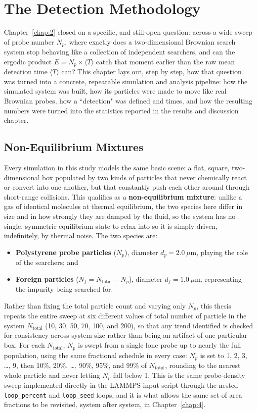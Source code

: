 \chapter{The Detection Methodology}
\label{chap:3}
Chapter~\ref{chap:2} closed on a specific, and still-open question: across a wide sweep of probe number $N_p$, where exactly does a two-dimensional Brownian search system stop behaving like a collection of independent searchers, and can the ergodic product $E = N_p \times \langle T \rangle$ catch that moment earlier than the raw mean detection time $\langle T \rangle$ can? This chapter lays out, step by step, how that question was turned into a concrete, repeatable simulation and analysis pipeline: how the simulated system was built, how its particles were made to move like real Brownian probes, how a ``detection" was defined and times, and how the resulting numbers were turned into the statistics reported in the results and discussion chapter.

\section{Non-Equilibrium Mixtures}
\label{sec:3.1}
Every simulation in this study models the same basic scene: a flat, square, two-dimensional box populated by two kinds of particles that never chemically react or convert into one another, but that constantly push each other around through short-range collisions. This qualifies as a \textbf{non-equilibrium mixture}: unlike a gas of identical molecules at thermal equilibrium, the two species here differ in size and in how strongly they are damped by the fluid, so the system has no single, symmetric equilibrium state to relax into so it is simply driven, indefinitely, by thermal noise. The two species are:

\begin{itemize}
  \item \textbf{Polystyrene probe particles} ($N_p$), diameter $d_p = 2.0~\mu\text{m}$, playing the role of the searchers; and
  \item \textbf{Foreign particles} ($N_f = N_\text{total} - N_p$), diameter $d_f = 1.0~\mu\text{m}$, representing the impurity being searched for.
\end{itemize}

Rather than fixing the total particle count and varying only $N_p$, this thesis repeats the entire sweep at six different values of total number of particle in the system $N_\text{total}$ (10, 30, 50, 70, 100, and 200), so that any trend identified is checked for consistency across system size rather than being an artifact of one particular box. For each $N_\text{total}$, $N_p$ is swept from a single lone probe up to nearly the full population, using the same fractional schedule in every case: $N_p$ is set to 1, 2, 3, \ldots, 9, then 10\%, 20\%, \ldots, 90\%, 95\%, and 99\% of $N_\text{total}$, rounding to the nearest whole particle and never letting $N_p$ fall below 1. This is the same probe-density sweep implemented directly in the LAMMPS input script through the nested \texttt{loop\_percent} and \texttt{loop\_seed} loops, and it is what allows the same set of area fractions to be revisited, system after system, in Chapter~\ref{chap:4}.


